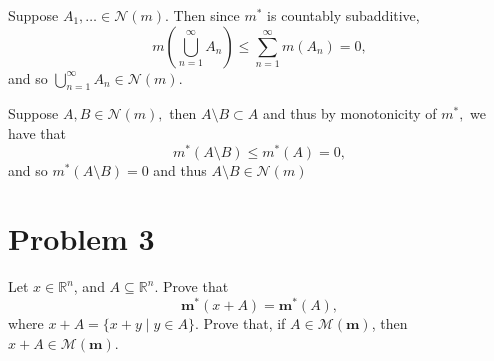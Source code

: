 \documentclass[11pt]{article}
\newcommand{\sm}{\setminus}
\begin{document}
\begin{problem}
\begin{enumerate}
\begin{solution}
        Suppose $A_1, \dots \in \mathcal{N}(m).$ Then since $m^*$ is countably subadditive, 
        \[m(\bigcup_{n=1}^\infty A_n) \leq \sum_{n=1}^\infty m(A_n) = 0,\] and so $\bigcup_{n=1}^\infty A_n \in \mathcal{N}(m).$

        Suppose $A,B \in \mathcal{N}(m),$ then $A\sm B \subset A$ and thus by monotonicity of $m^*,$ we have that 
        \[m^*(A \sm B) \leq m^*(A) = 0,\] and so $m^*(A\sm B) =  0$ and thus $A\sm B \in \mathcal{N}(m)$
    \end{solution}
    \end{enumerate}

\end{problem}


\newpage
\section*{Problem 3}
\begin{problem}
    Let $x \in \mathbb{R}^n$, and $A \subseteq \mathbb{R}^n$. Prove that
\[
\mathbf{m}^*(x + A) = \mathbf{m}^*(A),
\]
where $x + A = \{x + y \mid y \in A\}$. Prove that, if $A \in \mathcal{M}(\mathbf{m})$, then $x + A \in \mathcal{M}(\mathbf{m})$.
\end{problem}
\end{document}
